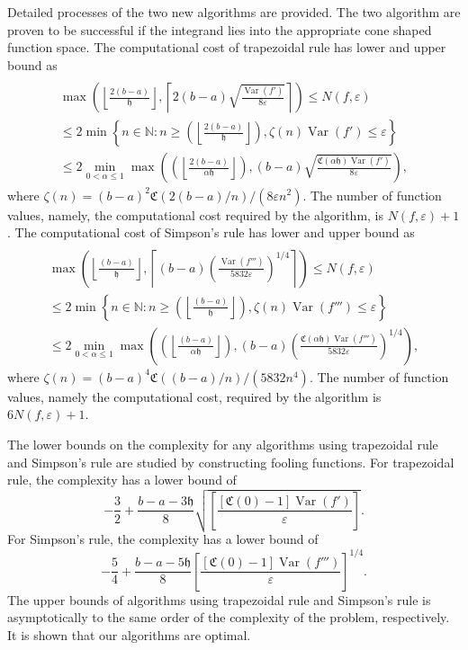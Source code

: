 \documentclass{iitthesis}
\DeclareMathOperator{\Var}{Var}
\theoremstyle{definition}
\theoremstyle{remark}
\begin{document}
Detailed processes of the two new algorithms are provided. The two algorithm are proven to be successful if the integrand lies into the appropriate cone shaped function space. The computational cost of trapezoidal rule has lower and upper bound as
\begin{multline*}\\
        \max\left(\left\lfloor\frac{2(b-a)}{\mathfrak{h}}\right\rfloor,\left\lceil2(b-a)\sqrt{\frac{\Var(f')}{8\varepsilon}}\right\rceil\right)\leq N(f,\varepsilon)\\ \leq 2\min\left\{n\in\mathbb{N}:n\geq\left(\left\lfloor\frac{2(b-a)}{\mathfrak{h}}\right\rfloor\right),\zeta(n)\Var(f')\leq\varepsilon\right\}\\ \leq 2\min_{0<\alpha\leq1}\max\left(\left(\left\lfloor\frac{2(b-a)}{\alpha\mathfrak{h}}\right\rfloor\right),(b-a)\sqrt{\frac{\mathfrak{C}(\alpha\mathfrak{h})\Var(f')}{8\varepsilon}}\right),
    \end{multline*}
    where $\zeta(n)=(b-a)^2\mathfrak{C}(2(b-a)/n)/(8\varepsilon n^2)$. The number of function values, namely, the computational cost required by the algorithm, is $N(f,\varepsilon)+1$.
    The computational cost of Simpson's rule has lower and upper bound as
    \begin{multline*}\\
         \max\left(\left\lfloor\frac{(b-a)}{\mathfrak{h}}\right\rfloor,\left\lceil(b-a)\left(\frac{\Var(f''')}{5832\varepsilon}\right)^{1/4}\right\rceil\right)\leq N(f,\varepsilon)\\ \leq 2\min\left\{n\in\mathbb{N}:n\geq\left(\left\lfloor\frac{(b-a)}{\mathfrak{h}}\right\rfloor\right),\zeta(n)\Var(f''')\leq\varepsilon\right\}\\ \leq 2\min_{0<\alpha\leq1}\max\left(\left(\left\lfloor\frac{(b-a)}{\alpha\mathfrak{h}}\right\rfloor\right),(b-a)\left(\frac{\mathfrak{C}(\alpha\mathfrak{h})\Var(f''')}{5832\varepsilon}\right)^{1/4}\right),
    \end{multline*}
  where $\zeta(n)=(b-a)^4\mathfrak{C}((b-a)/n)/(5832n^4)$. The number of function values, namely the computational cost, required by the algorithm is $6N(f,\varepsilon)+1$.

The lower bounds on the complexity for any algorithms using trapezoidal rule and Simpson's rule are studied by constructing fooling functions. For trapezoidal rule, the complexity has a lower bound of
$$
     -\frac{3}{2}+\frac{b-a-3\mathfrak{h}}{8}\sqrt{\left[\frac{[\mathfrak{C}(0)-1]\Var( f')}{\varepsilon}\right]}.
$$
For Simpson's rule, the complexity has a lower bound of
$$
     -\frac{5}{4}+\frac{b-a-5\mathfrak{h}}{8}\left[\frac{[\mathfrak{C}(0)-1]\Var( f''')}{\varepsilon}\right]^{1/4}.
$$
The upper bounds of algorithms using trapezoidal rule and Simpson's rule is asymptotically to the same order of the complexity of the problem, respectively. It is shown that our algorithms are optimal.
\end{document}
